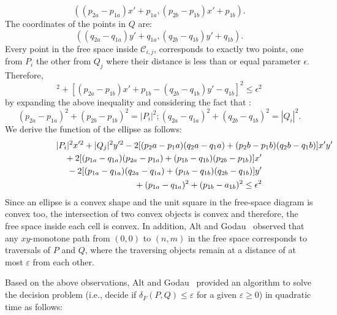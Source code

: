 \documentclass[12pt]{dalthesis}
\newcommand{\lee}{\leqslant}
\newcommand{\gee}{\geqslant}
\newcommand{\eps}{\varepsilon}
\newcommand{\CC}{{\mathscr C}}
\newcommand{\distF}{\delta_F}
\newcommand{\cell}[1]{{\CC_{#1}}}
\begin{document}
\abovedisplayshortskip=0pt
\belowdisplayshortskip=0pt
\abovedisplayskip=0pt
\belowdisplayskip=0pt

	\begin{displaymath}
	( (p_{2a} - p_{1a}) x' + p_{1a}, (p_{2b} - p_{1b})x' + p_{1b} ).
	\end{displaymath}
	The coordinates of the points in $Q$ are: 
	\begin{displaymath}
	( (q_{2a} - q_{1a}) y' + q_{1a}, (q_{2b} - q_{1b})y' + q_{1b} ).
	\end{displaymath}
	Every point in the free space inside $\cell{i,j}$, corresponds to exactly two points, one from $P_i$
	the other from $Q_j$ where their distance is less than or equal parameter $\epsilon$. Therefore, 
	\begin{displaymath}
	[ (p_{2a} - p_{1a})x' + p_{1a} - (q_{2a}-q_{1a}) ]^2 + [ (p_{2a} - p_{1b}) x' + p_{1b} - (q_{2b}-q_{1b})y'-q_{1b} ]^2 \le \epsilon^2
	\end{displaymath}
	by expanding the above inequality and considering the fact that :
	\begin{displaymath}
	(p_{2a}-p_{1a})^2 + (p_{2b} - p_{1b})^2 = |P_i|^2 ; (q_{2a} - q_{1a})^2 + (q_{2b}-q_{1b})^2 = |Q_i|^2.
	\end{displaymath}
	We derive the function of the ellipse as follows:
	\begin{eqnarray*}
	\lefteqn{|P_i|^2 x'^2 + |Q_j|^2y'^2 - 2 [(p_2a-p_1a)(q_2a-q_1a) + (p_2b-p_1b)(q_2b-q_1b)] x'y'} \\
	& & \mbox{}+2[(p_{1a}-q_{1a})(p_{2a}-p_{1a}) + (p_{1b}-q_{1b})(p_{2b}-p_{1b})]x'  \\
	& & \mbox{}-2[(p_{1a} - q_{1a})(q_{2a}-q_{1a}) + (p_{1b}-q_{1b})(q_{2b}-q_{1b})]y'  \\
	& & \mbox{}+(p_{1a}-q_{1a})^2 + (p_{1b} - a_{1b})^2 \le \epsilon ^2 
	\end{eqnarray*}	
	Since an ellipse is a convex  shape and the unit 
	square in the free-space diagram is convex too, 
	the intersection of two convex objects is convex and therefore, 
the free space inside each cell is convex. 
In addition, Alt and Godau~\cite{AltG95} observed that any $xy$-monotone 
path from $(0,0)$ to $(n,m)$ in the free space corresponds to traversals of $P$ and $Q$, 
where the traversing objects remain at a distance of at most $\eps$ from each other.


Based on the above observations, 
Alt and Godau~\cite{AltG95} provided an algorithm
to solve the decision problem (i.e., decide if $\distF(P,Q) 
\lee \eps$ for a given $\eps \gee 0$) in quadratic time as follows:
\end{document}
